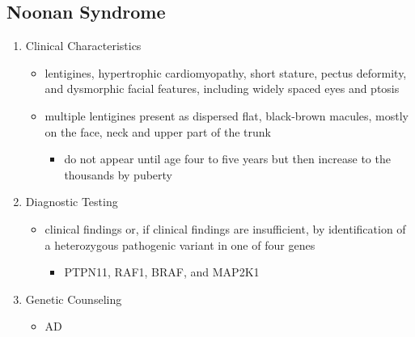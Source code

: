 \documentclass[12pt]{scrartcl}
\begin{document}
\subsection{Noonan Syndrome}
\label{sec:orgf260c5a}
\begin{enumerate}
\item Clinical Characteristics
\label{sec:org39f428e}
\begin{itemize}
\item lentigines, hypertrophic cardiomyopathy, short stature, pectus
deformity, and dysmorphic facial features, including widely spaced
eyes and ptosis
\item multiple lentigines present as dispersed flat, black-brown macules,
mostly on the face, neck and upper part of the trunk
\begin{itemize}
\item do not appear until age four to five years but then increase to
the thousands by puberty
\end{itemize}
\end{itemize}
\item Diagnostic Testing
\label{sec:org94d465d}
\begin{itemize}
\item clinical findings or, if clinical findings are insufficient, by
identification of a heterozygous pathogenic variant in one of four
genes
\begin{itemize}
\item PTPN11, RAF1, BRAF, and MAP2K1
\end{itemize}
\end{itemize}
\item Genetic Counseling
\label{sec:orgc5e09c4}
\begin{itemize}
\item AD
\end{itemize}
\end{enumerate}
\end{document}
